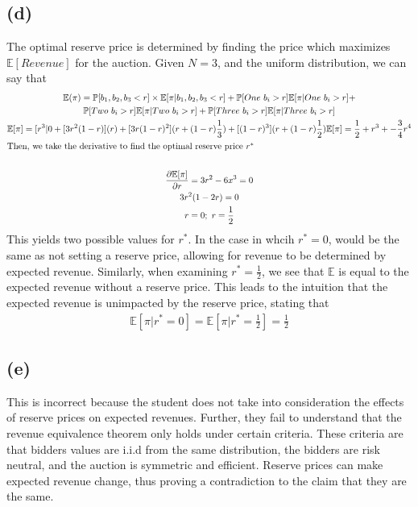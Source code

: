 \documentclass[10pt,a4paper]{article}
\begin{document}
  \subsection*{(d)}
    The optimal reserve price is determined by finding the price which maximizes $\mathbb{E}[Revenue]$ for the auction. Given $N=3$, and the uniform distribution, we can say that 
    \begin{gather*}
      \mathbb{E}(\pi)=\mathbb{P}[b_1, b_2, b_3 < r]\times\mathbb{E}[\pi|b_1,b_2,b_3<r] + \mathbb{P}[One \ b_i > r]\mathbb{E}[\pi|One \ b_i > r] + \\ \mathbb{P}[Two \ b_i > r]\mathbb{E}[\pi|Two \ b_i > r] + \mathbb{P}[Three \ b_i > r]\mathbb{E}[\pi|Three \ b_i > r] \\
      \mathbb{E}[\pi] = [r^3|0 + [3r^2(1-r)](r) + [3r(1-r)^2](r+(1-r)\frac{1}{3})+[(1-r)^3](r+(1-r)\frac{1}{2})
      \mathbb{E}[\pi] = \frac{1}{2} + r^3 + - \frac{3}{4}r^4 \\
      \shortintertext{Then, we take the derivative to find the optimal reserve price $r^*$} \\
      \frac{\partial \mathbb{E}[\pi]}{\partial r} = 3r^2 - 6x^3 = 0 \\
        3r^2(1-2r) = 0 \\
        r = 0; \ r = \frac{1}{2} \\
    \end{gather*}
    This yields two possible values for $r^*$. In the case in whcih $r^*=0$, would be the same as not setting a reserve price, allowing for revenue to be determined by expected revenue. Similarly, when examining $r^* = \frac{1}{2}$, we see that $\mathbb{E}$ is equal to the expected revenue without a reserve price. This leads to the intuition that the expected revenue is unimpacted by the reserve price, stating that
    \begin{gather*}
      \mathbb{E}[\pi|r^*=0] = \mathbb{E}[\pi|r^*=\frac{1}{2}] = \frac{1}{2}
    \end{gather*}
  \subsection*{(e)}
    This is incorrect because the student does not take into consideration the effects of reserve prices on expected revenues. Further, they fail to understand that the revenue equivalence theorem only holds under certain criteria. These criteria are that bidders values are i.i.d from the same distribution, the bidders are risk neutral, and the auction is symmetric and efficient. Reserve prices can make expected revenue change, thus proving a contradiction to the claim that they are the same.
\end{document}
